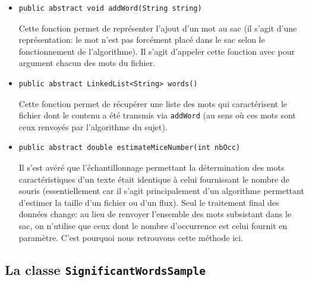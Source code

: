 \documentclass[12pt,a4paper,titlepage]{article}
\newcommand{\class}[1]{\texttt{#1}}
\begin{document}
\begin{itemize}
\item \begin{lstlisting}
public abstract void addWord(String string)
\end{lstlisting}
Cette fonction permet de représenter l'ajout d'un mot au sac (il s'agit d'une représentation: le mot n'est pas forcément placé dans le sac selon le fonctionnement de l'algorithme). Il s'agit d'appeler cette fonction avec pour argument chacun des mots du fichier.

\item \begin{lstlisting}
public abstract LinkedList<String> words()
\end{lstlisting}
Cette fonction permet de récupérer une liste des mots qui caractérisent le fichier dont le contenu a été transmis via \class{addWord} (au sens où ces mots sont ceux renvoyés par l'algorithme du sujet).

\item \begin{lstlisting}
public abstract double estimateMiceNumber(int nbOcc)
\end{lstlisting}
Il s'est avéré que l'échantillonnage permettant la détermination des mots caractéristiques d'un texte était identique à celui fournissant le nombre de souris (essentiellement car il s'agit principalement d'un algorithme permettant d'estimer la taille d'un fichier ou d'un flux). Seul le traitement final des données change: au lieu de renvoyer l'ensemble des mots subsistant dans le sac, on n'utilise que ceux dont le nombre d'occurrence est celui fournit en paramètre. C'est pourquoi nous retrouvons cette méthode ici.
\end{itemize}

\subsection{La classe \class{SignificantWordsSample}}
\end{document}
